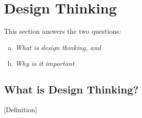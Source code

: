 
\section{Design Thinking } %
\label{sec:visual_design}
This section answers the two questions: 
\begin{enumerate}[a)]
	\item \emph{What is design thinking, and}
	\item \emph{Why is it important}
\end{enumerate}


\subsection{What is Design Thinking?} %
\label{sub:what_is_design_thinking}

[Definition] 


